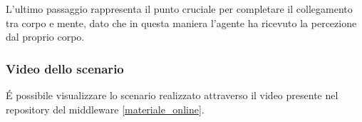 \medskip

L'ultimo passaggio rappresenta il punto cruciale per completare il collegamento tra corpo e mente, dato che in questa maniera l'agente ha ricevuto la percezione dal proprio corpo. 

\subsubsection{Video dello scenario}

\'E possibile visualizzare lo scenario realizzato attraverso il video presente nel repository del middleware \ref{materiale_online}.